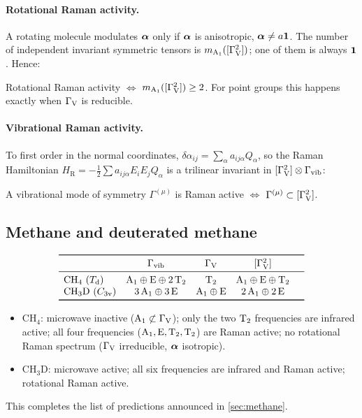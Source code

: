 \paragraph{Rotational Raman activity.} A rotating molecule modulates $\bm{\alpha}$
only if $\bm{\alpha}$ is anisotropic, $\bm{\alpha}\neq a\bm{1}$. The number of
independent invariant symmetric tensors is $m_{\mathrm{A}_1}([\Gamma_{\mathrm{V}}^2])$; one of them is
always $\bm{1}$. Hence:
\begin{keyresult}
Rotational Raman activity $\iff$ $m_{\mathrm{A}_1}([\Gamma_{\mathrm{V}}^2])\geq2$. For point groups this
happens exactly when $\Gamma_{\mathrm{V}}$ is reducible.
\end{keyresult}

\paragraph{Vibrational Raman activity.} To first order in the normal coordinates,
$\delta\alpha_{ij}=\sum_\alpha a_{ij\alpha}Q_\alpha$, so the Raman Hamiltonian
$H_{\mathrm{R}}=-\tfrac12\sum a_{ij\alpha}E_iE_jQ_\alpha$ is a trilinear invariant in
$[\Gamma_{\mathrm{V}}^2]\otimes\Gamma_{\mathrm{vib}}$:
\begin{keyresult}
A vibrational mode of symmetry $\Gamma^{(\mu)}$ is Raman active $\iff$
$\Gamma^{(\mu)}\subset[\Gamma_{\mathrm{V}}^2]$.
\end{keyresult}

\subsection{Methane and deuterated methane}
\[
\begin{array}{lcccc}
\toprule
 & \Gvib & \GV & [\GV^2] & \\
\midrule
\mathrm{CH_4}\ (\Td) & \irr{A}_1\oplus\irr{E}\oplus2\,\irr{T}_2 & \irr{T}_2 &
   \irr{A}_1\oplus\irr{E}\oplus\irr{T}_2 &\\
\mathrm{CH_3D}\ (\Cv{3}) & 3\,\irr{A}_1\oplus3\,\irr{E} & \irr{A}_1\oplus\irr{E} &
   2\,\irr{A}_1\oplus2\,\irr{E} &\\
\bottomrule
\end{array}
\]
\begin{itemize}
\item $\mathrm{CH_4}$: microwave inactive ($\mathrm{A}_1\not\subset\Gamma_{\mathrm{V}}$); only the two
      $\mathrm{T}_2$ frequencies are infrared active; all four frequencies
      ($\mathrm{A}_1,\mathrm{E},\mathrm{T}_2,\mathrm{T}_2$) are Raman active; no rotational Raman
      spectrum ($\Gamma_{\mathrm{V}}$ irreducible, $\bm{\alpha}$ isotropic).
\item $\mathrm{CH_3D}$: microwave active; all six frequencies are infrared and Raman
      active; rotational Raman active.
\end{itemize}
This completes the list of predictions announced in \cref{sec:methane}.

